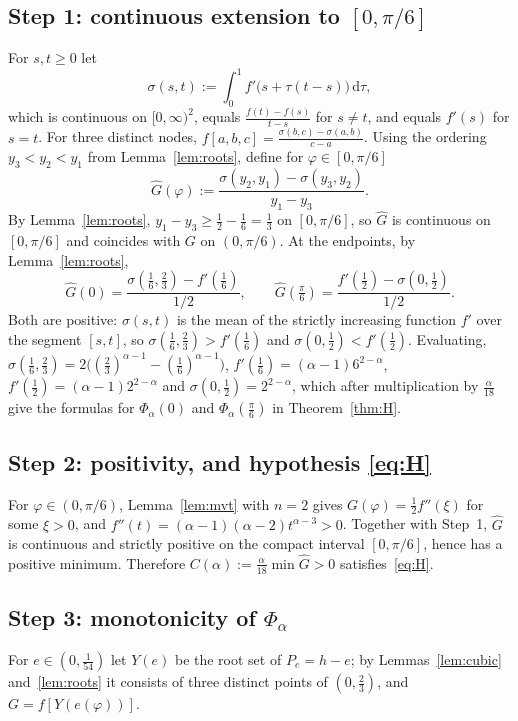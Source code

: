 \documentclass[11pt]{amsart}
\theoremstyle{remark}
\newcommand{\dd}{\,\mathrm{d}}
\begin{document}
\subsection*{\texorpdfstring{Step 1: continuous extension to $[0,\pi/6]$}{Step 1: continuous extension}}
For $s,t\ge0$ let
\[
\sigma(s,t):=\int_0^1 f'\bigl(s+\tau(t-s)\bigr)\dd\tau ,
\]
which is continuous on $[0,\infty)^2$, equals $\frac{f(t)-f(s)}{t-s}$ for $s\ne t$, and
equals $f'(s)$ for $s=t$. For three distinct nodes,
$f[a,b,c]=\frac{\sigma(b,c)-\sigma(a,b)}{c-a}$. Using the ordering
$y_3<y_2<y_1$ from Lemma~\ref{lem:roots}, define for $\varphi\in[0,\pi/6]$
\[
\widehat G(\varphi):=\frac{\sigma(y_2,y_1)-\sigma(y_3,y_2)}{y_1-y_3}.
\]
By Lemma~\ref{lem:roots}, $y_1-y_3\ge\frac12-\frac16=\frac13$ on $[0,\pi/6]$, so
$\widehat G$ is continuous on $[0,\pi/6]$ and coincides with $G$ on $(0,\pi/6)$. At the
endpoints, by Lemma~\ref{lem:roots},
\[
\widehat G(0)=\frac{\sigma(\frac16,\frac23)-f'(\frac16)}{1/2},\qquad
\widehat G(\tfrac\pi6)=\frac{f'(\frac12)-\sigma(0,\frac12)}{1/2}.
\]
Both are positive: $\sigma(s,t)$ is the mean of the strictly increasing function $f'$
over the segment $[s,t]$, so $\sigma(\frac16,\frac23)>f'(\frac16)$ and
$\sigma(0,\frac12)<f'(\frac12)$. Evaluating,
$\sigma(\frac16,\frac23)=2\bigl((\frac23)^{\alpha-1}-(\frac16)^{\alpha-1}\bigr)$,
$f'(\frac16)=(\alpha-1)6^{2-\alpha}$, $f'(\frac12)=(\alpha-1)2^{2-\alpha}$ and
$\sigma(0,\frac12)=2^{2-\alpha}$, which after multiplication by $\frac\alpha{18}$ give the
formulas for $\Phi_\alpha(0)$ and $\Phi_\alpha(\frac\pi6)$ in Theorem~\ref{thm:H}.

\subsection*{\texorpdfstring{Step 2: positivity, and hypothesis \eqref{eq:H}}{Step 2: positivity and hypothesis (H)}}
For $\varphi\in(0,\pi/6)$, Lemma~\ref{lem:mvt} with $n=2$ gives
$G(\varphi)=\frac12 f''(\xi)$ for some $\xi>0$, and
$f''(t)=(\alpha-1)(\alpha-2)t^{\alpha-3}>0$. Together with Step~1, $\widehat G$ is
continuous and strictly positive on the compact interval $[0,\pi/6]$, hence has a
positive minimum. Therefore $C(\alpha):=\frac{\alpha}{18}\min\widehat G>0$
satisfies~\eqref{eq:H}.

\subsection*{\texorpdfstring{Step 3: monotonicity of $\Phi_\alpha$}{Step 3: monotonicity}}
For $e\in(0,\frac1{54})$ let $Y(e)$ be the root set of $P_e=h-e$; by
Lemmas~\ref{lem:cubic} and~\ref{lem:roots} it consists of three distinct points of
$(0,\frac23)$, and $G=f[Y(e(\varphi))]$.
\end{document}
